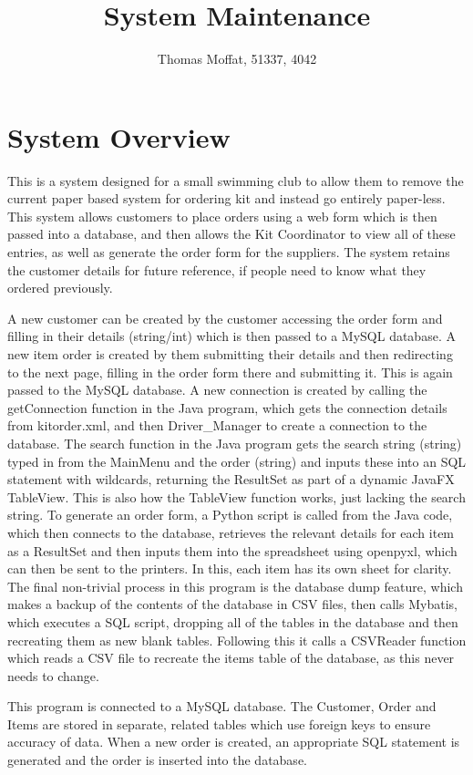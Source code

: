 \documentclass[11pt]{report}
\title{\textbf{System Maintenance}}
\author{Thomas Moffat, 51337, 4042}
\begin{document}
\maketitle

\section{System Overview}
This is a system designed for a small swimming club to allow them to remove the current paper based system for ordering kit and instead go entirely paper-less. This system allows customers to place orders using a web form which is then passed into a database, and then allows the Kit Coordinator to view all of these entries, as well as generate the order form for the suppliers. The system retains the customer details for future reference, if people need to know what they ordered previously. \par A new customer can be created by the customer accessing the order form and filling in their details (string/int) which is then passed to a MySQL database. A new item order is created by them submitting their details and then redirecting to the next page, filling in the order form there and submitting it. This is again passed to the MySQL database. A new connection is created by calling the getConnection function in the Java program, which gets the connection details from kitorder.xml, and then Driver\_Manager to create a connection to the database. The search function in the Java program gets the search string (string) typed in from the MainMenu and the order (string) and inputs these into an SQL statement with wildcards, returning the ResultSet as part of a dynamic JavaFX TableView. This is also how the TableView function works, just lacking the search string. To generate an order form, a Python script is called from the Java code, which then connects to the database, retrieves the relevant details for each item as a ResultSet and then inputs them into the spreadsheet using openpyxl, which can then be sent to the printers. In this, each item has its own sheet for clarity. The final non-trivial process in this program is the database dump feature, which makes a backup of the contents of the database in CSV files, then calls Mybatis, which executes a SQL script, dropping all of the tables in the database and then recreating them as new blank tables. Following this it calls a CSVReader function which reads a CSV file to recreate the items table of the database, as this never needs to change. \par This program is connected to a MySQL database. The Customer, Order and Items are stored in separate, related tables which use foreign keys to ensure accuracy of data. When a new order is created, an appropriate SQL statement is generated and the order is inserted into the database. 
\end{document}
